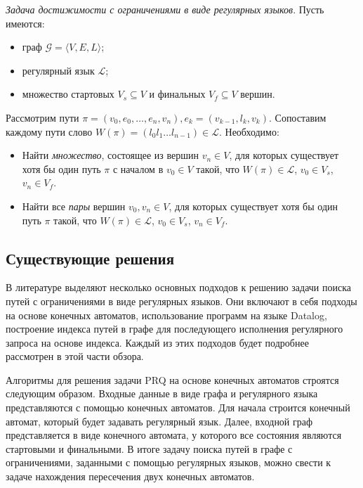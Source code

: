 \begin{rudefinition} \emph{Задача достижимости с ограничениями в виде регулярных языков}. Пусть имеются:
    \begin{itemize}
        \item граф $\mathcal{G} = \langle V, E, L\rangle$;
        \item регулярный язык $\mathcal{L}$;
        \item множество стартовых $V_s \subseteq V$ и финальных $V_f \subseteq V$ вершин.
    \end{itemize}
    Рассмотрим пути $\pi = (v_0, e_0, \dots, e_n, v_n), e_k = (v_{k-1}, l_k, v_{k})$. Сопоставим каждому пути слово $W(\pi)=(l_0l_1 \dots l_{n-1}) \in \mathcal{L}$. Необходимо:

    \begin{itemize}
        \item Найти \textit{множество}, состоящее из вершин $v_n \in V$, для которых существует хотя бы один путь $\pi$ с началом в $v_0 \in V$ такой, что $W(\pi) \in \mathcal{L}$, $v_0 \in V_s$, $v_n \in V_f$.
        \item Найти все \textit{пары} вершин $v_0, v_n \in V$, для которых существует хотя бы один путь $\pi$ такой, что $W(\pi) \in \mathcal{L}$, $v_0 \in V_s$, $v_n \in V_f$.
    \end{itemize}
\end{rudefinition}

\subsection{Существующие решения}

В литературе выделяют несколько основных подходов к решению задачи поиска путей с ограничениями в виде регулярных языков. Они включают в себя подходы на основе конечных автоматов, использование программ на языке Datalog, построение индекса путей в графе для последующего исполнения регулярного запроса на основе индекса. Каждый из этих подходов будет подробнее рассмотрен в этой части обзора.

Алгоритмы для решения задачи PRQ на основе конечных автоматов строятся следующим образом. Входные данные в виде графа и регулярного языка представляются с помощью конечных автоматов. Для начала строится конечный автомат, который будет задавать регулярный язык. Далее, входной граф представляется в виде конечного автомата, у которого все состояния являются стартовыми и финальными. В итоге задачу поиска путей в графе с ограничениями, заданными с помощью регулярных языков, можно свести к задаче нахождения пересечения двух конечных автоматов.

